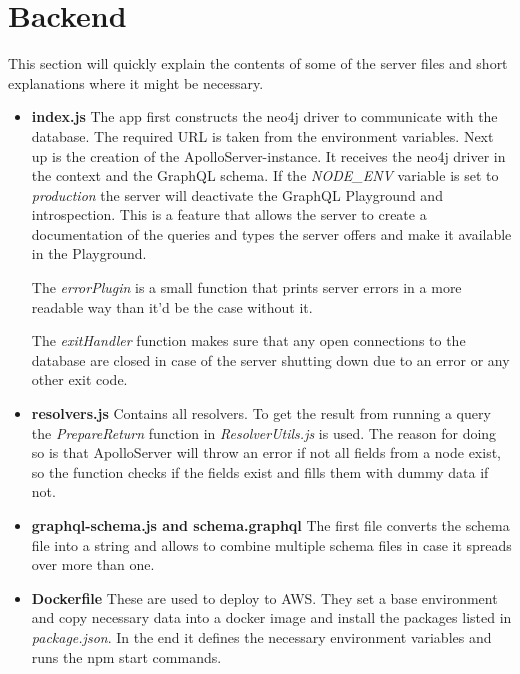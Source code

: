 \section{Backend}
This section will quickly explain the contents of some of the server files and short explanations where it might be necessary.
\begin{itemize}
\item \textbf{index.js} The app first constructs the neo4j driver to communicate with the database. The required URL is taken from the environment variables. Next up is the creation of the ApolloServer-instance. It receives the neo4j driver in the context and the GraphQL schema. If the \emph{NODE\_ENV} variable is set to \emph{production} the server will deactivate the GraphQL Playground and introspection. This is a feature that allows the server to create a documentation of the queries and types the server offers and make it available in the Playground.

The \emph{errorPlugin} is a small function that prints server errors in a more readable way than it'd be the case without it.

The \emph{exitHandler} function makes sure that any open connections to the database are closed in case of the server shutting down due to an error or any other exit code.

\item \textbf{resolvers.js} Contains all resolvers. To get the result from running a query the \emph{PrepareReturn} function in \emph{ResolverUtils.js} is used. The reason for doing so is that ApolloServer will throw an error if not all fields from a node exist, so the function checks if the fields exist and fills them with dummy data if not.

\item \textbf{graphql-schema.js and schema.graphql} The first file converts the schema file into a string and allows to combine multiple schema files in case it spreads over more than one.

\item \textbf{Dockerfile} These are used to deploy to AWS. They set a base environment and copy necessary data into a docker image and install the packages listed in \emph{package.json}. In the end it defines the necessary environment variables and runs the npm start commands.
\end{itemize}

